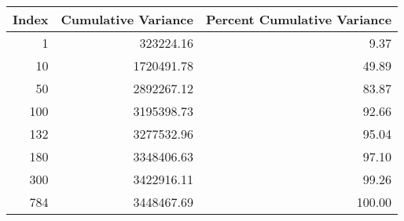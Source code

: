\begin{tabular}{rrr}
\toprule
Index & Cumulative Variance & Percent Cumulative Variance \\
\midrule
1 & 323224.16 & 9.37 \\
10 & 1720491.78 & 49.89 \\
50 & 2892267.12 & 83.87 \\
100 & 3195398.73 & 92.66 \\
132 & 3277532.96 & 95.04 \\
180 & 3348406.63 & 97.10 \\
300 & 3422916.11 & 99.26 \\
784 & 3448467.69 & 100.00 \\
\bottomrule
\end{tabular}
